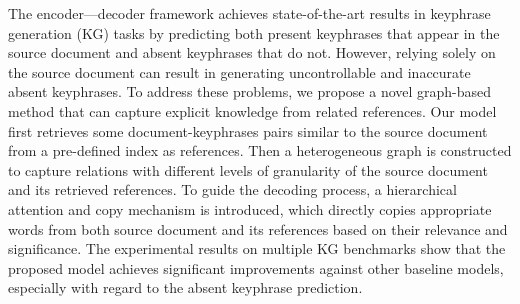 The encoder---decoder framework achieves state-of-the-art results in keyphrase generation (KG) tasks by predicting both present keyphrases that appear in the source document and absent keyphrases that do not. However, relying solely on the source document can result in generating uncontrollable and inaccurate absent keyphrases. To address these problems, we propose a novel graph-based method that can capture explicit knowledge from related references. Our model first retrieves some document-keyphrases pairs similar to the source document from a pre-defined index as references. Then a heterogeneous graph is constructed to capture relations with different levels of granularity of the source document and its retrieved references. To guide the decoding process, a hierarchical attention and copy mechanism is introduced, which directly copies appropriate words from both source document and its references based on their relevance and significance. The experimental results on multiple KG benchmarks show that the proposed model achieves significant improvements against other baseline models, especially with regard to the absent keyphrase prediction.
